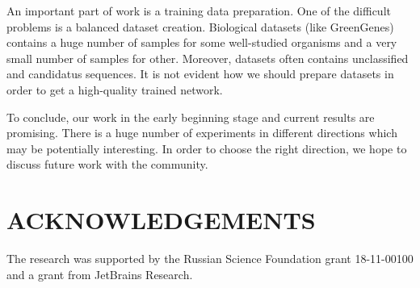 \documentclass[a4paper,twoside]{article}
\begin{document}
An important part of work is a training data preparation.
One of the difficult problems is a balanced dataset creation.
Biological datasets (like GreenGenes) contains a huge number of samples for some well-studied organisms and a very small number of samples for other.
Moreover, datasets often contains unclassified and candidatus sequences.
It is not evident how we should prepare datasets in order to get a high-quality trained network.

To conclude, our work in the early beginning stage and current results are promising. 
There is a huge number of experiments in different directions which may be potentially interesting.
In order to choose the right direction, we hope to discuss future work with the community.


\section*{\uppercase{Acknowledgements}}

\noindent The research was supported by the Russian Science Foundation grant 18-11-00100 and a grant from JetBrains Research.




{\small
}


\vfill
\end{document}
